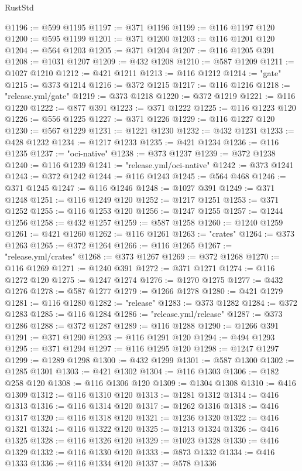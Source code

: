 \begin{lexlean}{RustStd}
\begin{coremodule}
@1196 := @599 @1195
@1197 := @371 @1196
@1199 := @116 @1197 @120
@1200 := @595 @1199
@1201 := @371 @1200
@1203 := @116 @1201 @120
@1204 := @564 @1203
@1205 := @371 @1204
@1207 := @116 @1205 @391
@1208 := @1031 @1207
@1209 := @432 @1208
@1210 := @587 @1209
@1211 := @1027 @1210
@1212 := @421 @1211
@1213 := @116 @1212
@1214 := "gate"
@1215 := @373 @1214
@1216 := @372 @1215
@1217 := @116 @1216
@1218 := "release.yml/gate"
@1219 := @373 @1218
@1220 := @372 @1219
@1221 := @116 @1220
@1222 := @877 @391
@1223 := @371 @1222
@1225 := @116 @1223 @120
@1226 := @556 @1225
@1227 := @371 @1226
@1229 := @116 @1227 @120
@1230 := @567 @1229
@1231 := @1221 @1230
@1232 := @432 @1231
@1233 := @428 @1232
@1234 := @1217 @1233
@1235 := @421 @1234
@1236 := @116 @1235
@1237 := "oci-native"
@1238 := @373 @1237
@1239 := @372 @1238
@1240 := @116 @1239
@1241 := "release.yml/oci-native"
@1242 := @373 @1241
@1243 := @372 @1242
@1244 := @116 @1243
@1245 := @564 @468
@1246 := @371 @1245
@1247 := @116 @1246
@1248 := @1027 @391
@1249 := @371 @1248
@1251 := @116 @1249 @120
@1252 := @1217 @1251
@1253 := @371 @1252
@1255 := @116 @1253 @120
@1256 := @1247 @1255
@1257 := @1244 @1256
@1258 := @432 @1257
@1259 := @587 @1258
@1260 := @1240 @1259
@1261 := @421 @1260
@1262 := @116 @1261
@1263 := "crates"
@1264 := @373 @1263
@1265 := @372 @1264
@1266 := @116 @1265
@1267 := "release.yml/crates"
@1268 := @373 @1267
@1269 := @372 @1268
@1270 := @116 @1269
@1271 := @1240 @391
@1272 := @371 @1271
@1274 := @116 @1272 @120
@1275 := @1247 @1274
@1276 := @1270 @1275
@1277 := @432 @1276
@1278 := @587 @1277
@1279 := @1266 @1278
@1280 := @421 @1279
@1281 := @116 @1280
@1282 := "release"
@1283 := @373 @1282
@1284 := @372 @1283
@1285 := @116 @1284
@1286 := "release.yml/release"
@1287 := @373 @1286
@1288 := @372 @1287
@1289 := @116 @1288
@1290 := @1266 @391
@1291 := @371 @1290
@1293 := @116 @1291 @120
@1294 := @494 @1293
@1295 := @371 @1294
@1297 := @116 @1295 @120
@1298 := @1247 @1297
@1299 := @1289 @1298
@1300 := @432 @1299
@1301 := @587 @1300
@1302 := @1285 @1301
@1303 := @421 @1302
@1304 := @116 @1303
@1306 := @182 @258 @120
@1308 := @116 @1306 @120
@1309 := @1304 @1308
@1310 := @416 @1309
@1312 := @116 @1310 @120
@1313 := @1281 @1312
@1314 := @416 @1313
@1316 := @116 @1314 @120
@1317 := @1262 @1316
@1318 := @416 @1317
@1320 := @116 @1318 @120
@1321 := @1236 @1320
@1322 := @416 @1321
@1324 := @116 @1322 @120
@1325 := @1213 @1324
@1326 := @416 @1325
@1328 := @116 @1326 @120
@1329 := @1023 @1328
@1330 := @416 @1329
@1332 := @116 @1330 @120
@1333 := @873 @1332
@1334 := @416 @1333
@1336 := @116 @1334 @120
@1337 := @578 @1336

\end{coremodule}
\end{lexlean}

